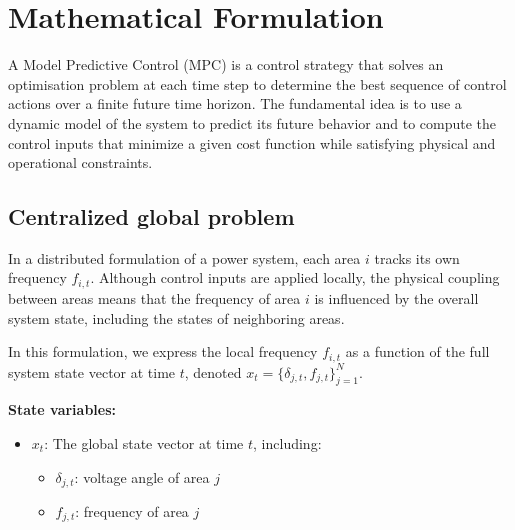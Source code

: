 \documentclass{article}
\begin{document}
\newpage
\section{Mathematical Formulation}
A Model Predictive Control (MPC) is a control strategy that solves an optimisation problem at each time step to determine the best sequence of control actions over a finite future time horizon. The fundamental idea is to use a dynamic model of the system to predict its future behavior and to compute the control inputs that minimize a given cost function while satisfying physical and operational constraints.

\begin{comment}
At every time step, MPC performs the following steps:
\begin{enumerate}
\item Measure or estimate the current state of the system.
\item Solve an optimization problem over a prediction horizon $T$, minimizing a cost function (e.g., deviation from desired trajectories, energy usage, or frequency deviation).
\item Apply only the first control input from the optimal sequence.
\item Move forward one time step and repeat the process using updated state information.
\end{enumerate}
\end{comment}

\subsection{Centralized global problem}

In a distributed formulation of a power system, each area $i$ tracks its own frequency $f_{i,t}$. Although control inputs are applied locally, the physical coupling between areas means that the frequency of area $i$ is influenced by the overall system state, including the states of neighboring areas.

In this formulation, we express the local frequency $f_{i,t}$ as a function of the full system state vector at time $t$, denoted $x_t = \{ \delta_{j,t}, f_{j,t} \}_{j=1}^{N}$.

\textbf{State variables:}
\begin{itemize}
    \item $x_t$: The global state vector at time $t$, including:
    \begin{itemize}
        \item $\delta_{j,t}$: voltage angle of area $j$
        \item $f_{j,t}$: frequency of area $j$
    \end{itemize}
\end{itemize}
\end{document}

